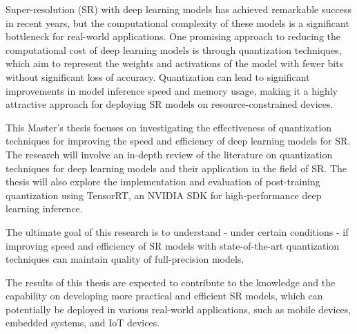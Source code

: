 \label{chap:Introduction}

Super-resolution (SR) with deep learning models has achieved remarkable success in recent years, but the computational complexity of these models is a significant bottleneck for real-world applications. One promising approach to reducing the computational cost of deep learning models is through quantization techniques, which aim to represent the weights and activations of the model with fewer bits without significant loss of accuracy. Quantization can lead to significant improvements in model inference speed and memory usage, making it a highly attractive approach for deploying SR models on resource-constrained devices.

This Master's thesis focuses on investigating the effectiveness of quantization techniques for improving the speed and efficiency of deep learning models for SR. The research will involve an in-depth review of the literature on quantization techniques for deep learning models and their application in the field of SR. The thesis will also explore the implementation and evaluation of post-training quantization using TensorRT, an NVIDIA SDK for high-performance deep learning inference. 

The ultimate goal of this research is to understand - under certain conditions - if improving speed and efficiency of SR models with state-of-the-art quantization techniques can maintain quality of full-precision models.

The results of this thesis are expected to contribute to the knowledge and the capability on developing more practical and efficient SR models, which can potentially be deployed in various real-world applications, such as mobile devices, embedded systems, and IoT devices.

